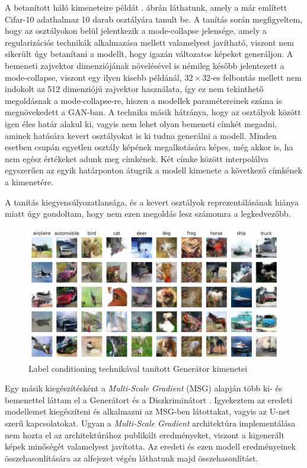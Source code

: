 A betanított háló kimeneteire példát . ábrán láthatunk, amely a már említett Cifar-10 adathalmaz 10 darab osztályára tanult be. A tanítás során megfigyeltem, hogy az osztályokon belül jelentkezik a mode-collapse jelensége, amely a regularizációs technikák alkalmazása mellett valamelyest javítható, viszont nem sikerült úgy betanítani a modellt, hogy igazán változatos képeket generáljon. A bemeneti zajvektor dimenziójának növelésével is némileg később jelentezett a mode-collapse, viszont egy ilyen kisebb példánál, $32 \times 32$-es felbontás mellett nem indokolt az 512 dimenziójú zajvektor használata, így ez nem tekinthető megoldásnak a mode-collapse-re, hiszen a modellek paramétereinek száma is megnövekedett a GAN-ban.
A technika másik hátránya, hogy az osztályok között igen éles határ alakul ki, vagyis nem lehet olyan bemeneti címkét megadni, aminek hatására kevert osztályokat is ki tudna generálni a modell. Minden esetben csupán egyetlen osztály képének megalkotására képes, még akkor is, ha nem egész értékeket adunk meg címkének. Két címke között interpolálva egyszerűen az egyik határponton átugrik a modell kimenete a következő címkének a kimenetére.

A tanítás kiegyensúlyozatlansága, és a kevert osztályok reprezentálásának hiánya miatt úgy gondoltam, hogy nem ezen megoldás lesz számomra a legkedvezőbb.

\begin{figure}[h]
	\centering
	\includegraphics[width=13cm]{images/label_conditioning.png}
	\caption{Label conditioning technikával tanított Generátor kimenetei}
	\label{fig:labelconditioning}
\end{figure}


Egy másik kiegészítésként a \textit{Multi-Scale Gradient} (MSG) alapján több ki- és bemenettel láttam el a Generátort és a Diszkriminátort \cite{karnewar2020msg}. Igyekeztem az eredeti modellemet kiegészíteni és alkalmazni az MSG-ben látottakat, vagyis az U-net szerű kapcsolatokat. Ugyan a \textit{Multi-Scale Gradient} architektúra implementálása nem hozta el az architektúrához publikált eredményeket, viszont a kigenerált képek minőségét valamelyest javította. Az eredeti és ezen modell eredményeinek összehasonlítására az alfejezet végén láthatunk majd összehasonlítást.

